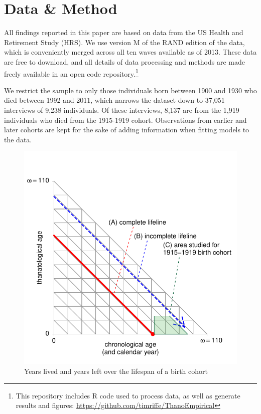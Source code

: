 \documentclass[11pt,oneside]{article} %
\begin{document}
\section*{Data \& Method}

All findings reported in this paper are based on data from the US Health and
Retirement Study (HRS). We use version M of the RAND edition of the data, which
is conveniently merged across all ten waves available as of 2013.
These data are free to download, and all details of data processing and methods are made freely available in an open code
repository.\footnote{This
repository includes R code used to process data, as well as generate results and
figures: \url{https://github.com/timriffe/ThanoEmpirical}}

We restrict the sample to only those
individuals born between 1900 and 1930 who died between 1992 and 2011, which
narrows the dataset down to 37,051 interviews of 9,238 individuals. Of
these interviews, 8,137 are from the 1,919 individuals who died from the
1915-1919 cohort. Observations from earlier and later cohorts are kept for the
sake of adding information when fitting models to the data.
%
\begin{figure}[!h]
\centering
\caption{Years lived and years left over the lifespan of a birth cohort}
\label{fig:LexisOrtho}
	\includegraphics{Figures/LexisOrtho.pdf}
\end{figure}
\end{document}
